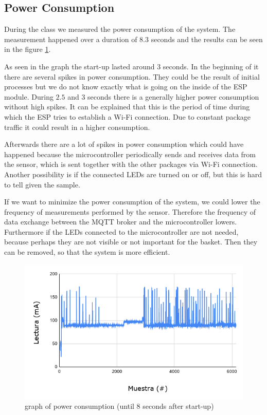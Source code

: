 \documentclass{article}
\begin{document}
\subsection{Power Consumption}
During the class we measured the power consumption of the system. The
measurement happened over a duration of $8.3$ seconds and the results can be
seen in the figure \ref{chart_power}.\par
As seen in the graph the start-up lasted around 3 seconds. In the
beginning of it there are several spikes in power consumption. They could be the
result of initial processes but we do not know exactly what is going on the inside of
the ESP module. During $2.5$ and $3$ seconds there is a generally higher power
consumption without high spikes. It can be explained that this is the period of time during which
the ESP tries to establish a Wi-Fi connection. Due to constant package traffic
it could result in a higher consumption.\par
Afterwards there are a lot of spikes in power consumption which could have
happened because the microcontroller periodically sends and receives data from
the sensor, which is sent together with the other packages via Wi-Fi connection. Another possibility is if the connected LEDs are turned on or off, but this is hard to
tell given the sample.\par

If we want to minimize the power consumption of the system, we could lower
the frequency of measurements performed by the sensor. Therefore the
frequency of data exchange between the MQTT broker and the microcontroller lowers. Furthermore if the LEDs connected to the microcontroller are not needed, because perhaps they are not
visible or not important for the basket. Then they can be removed, so that the
system is more efficient.

\begin{figure}[]
\centering \includegraphics[scale=0.5]{images/chart.png}
\caption{graph of power consumption (until 8 seconds after start-up)}
\label{chart_power}
\end{figure}
\end{document}
